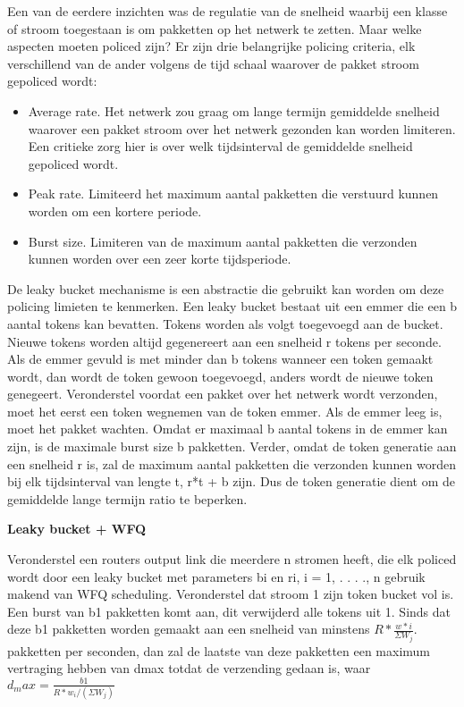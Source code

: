 
Een van de eerdere inzichten was de regulatie van de snelheid waarbij een klasse of stroom toegestaan is om pakketten op het netwerk te zetten. Maar welke aspecten moeten policed zijn? Er zijn drie belangrijke policing criteria, elk verschillend van de ander volgens de tijd schaal waarover de pakket stroom gepoliced wordt:
\begin{itemize}
\item 	Average rate. Het netwerk zou graag om lange termijn gemiddelde snelheid waarover een pakket stroom over het netwerk gezonden kan worden limiteren. Een critieke zorg hier is over welk tijdsinterval de gemiddelde snelheid gepoliced wordt.
\item 	Peak rate. Limiteerd het maximum aantal pakketten die verstuurd kunnen worden om een kortere periode.
\item 	Burst size. Limiteren van de maximum aantal pakketten die verzonden kunnen worden over een zeer korte tijdsperiode.
\end{itemize}

De leaky bucket mechanisme is een abstractie die gebruikt kan worden om deze policing limieten te kenmerken. Een leaky bucket bestaat uit een emmer die een b aantal tokens kan bevatten. Tokens worden als volgt toegevoegd aan de bucket. Nieuwe tokens worden altijd gegenereert aan een snelheid r tokens per seconde. Als de emmer gevuld is met minder dan b tokens wanneer een token gemaakt wordt, dan wordt de token gewoon toegevoegd, anders wordt de nieuwe token genegeert.
Veronderstel voordat een pakket over het netwerk wordt verzonden, moet het eerst een token wegnemen van de token emmer. Als de emmer leeg is, moet het pakket wachten.
Omdat er maximaal b aantal tokens in de emmer kan zijn, is de maximale burst size b pakketten. Verder, omdat de token generatie aan een snelheid r is, zal de maximum aantal pakketten die verzonden kunnen worden bij elk tijdsinterval van lengte t, r*t + b zijn. Dus de token generatie dient om de gemiddelde lange termijn ratio te beperken.

\textbf{Leaky bucket + WFQ}

Veronderstel een routers output link die meerdere n stromen heeft, die elk policed wordt door een leaky bucket met parameters bi en ri, i = 1, . . . ., n gebruik makend van WFQ scheduling. Veronderstel dat stroom 1 zijn token bucket vol is. Een burst van b1 pakketten komt aan, dit verwijderd alle tokens uit 1. Sinds dat deze b1 pakketten worden gemaakt aan een snelheid van minstens $R * \frac{w*i}{\Sigma W_j}$. pakketten per seconden, dan zal de laatste van deze pakketten een maximum vertraging hebben van dmax totdat de verzending gedaan is, waar $d_max = \frac{b1}{R * w_i / (\Sigma W_j)}$


